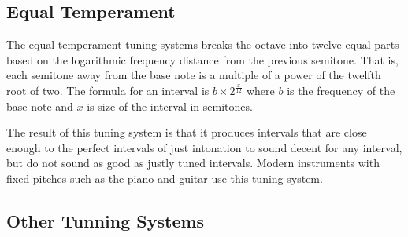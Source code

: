 \subsection{Equal Temperament} \label{mathinmusic:intervals:equal}

The equal temperament tuning systems breaks the octave into twelve equal parts based on the logarithmic frequency distance from the previous semitone.
That is, each semitone away from the base note is a multiple of a power of the twelfth root of two.
The formula for an interval is $b \times 2^{\frac{x}{12}}$ where $b$ is the frequency of the base note and $x$ is size of the interval in semitones.

The result of this tuning system is that it produces intervals that are close enough to the perfect intervals of just intonation to sound decent for any interval, but do not sound as good as justly tuned intervals.
Modern instruments with fixed pitches such as the piano and guitar use this tuning system.

\subsection{Other Tunning Systems} \label{mathinmusic:intervals:othertuning}



